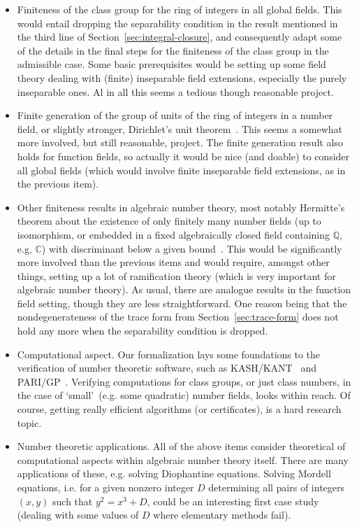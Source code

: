 \documentclass[a4paper,USenglish,cleveref, autoref, thm-restate]{lipics-v2021}
\newcommand{\C}{\mathbb{C}}
\newcommand{\Q}{\mathbb{Q}}
\begin{document}
\begin{itemize}
\item Finiteness of the class group for the ring of integers in all global fields. This would entail dropping the separability condition in the result mentioned in the third line of Section~\ref{sec:integral-closure}, and consequently adapt some of the details in the final steps for the finiteness of the class group in the admissible case. Some basic prerequisites would be setting up some field theory dealing with (finite) inseparable field extensions, especially the purely inseparable ones. 
Al in all this seems a tedious though reasonable project.
\item Finite generation of the group of units of the ring of integers in a number field, or slightly stronger, Dirichlet's unit theorem~\cite[Theorem 7.4]{Neukirch}. This seems a somewhat more involved, but still reasonable, project. The finite generation result also holds for function fields, so actually it would be nice (and doable) to consider all global fields (which would  involve finite inseparable field extensions, as in the previous item).
\item Other finiteness results in algebraic number theory, most notably Hermitte's theorem about the existence of only finitely many number fields (up to isomorphism, or embedded in a fixed algebraically closed field containing $\Q$, e.g. $\C$) with discriminant below a given bound~\cite[Theorem 2.16]{Neukirch}. This would be significantly more involved than the previous items and would require, amongst other things, setting up a lot of ramification theory (which is very important for algebraic number theory).
As usual, there are analogue results in the function field setting, though they are less straightforward. One reason being that the nondegenerateness of the trace form from Section~\ref{sec:trace-form} does not hold any more when the separability condition is dropped.
\item Computational aspect. Our formalization lays some foundations to the verification of number theoretic software,
such as KASH/KANT~\cite{kash} and PARI/GP~\cite{PARI2}. Verifying computations for class groups, or just class numbers, in the case of \lq small\rq\ (e.g. some quadratic) number fields, looks within reach. Of course, getting really efficient algorithms (or certificates), is a hard research topic. 
\item Number theoretic applications. All of the above items consider theoretical of computational aspects within algebraic number theory itself. There are many applications of these, e.g. solving Diophantine equations. Solving Mordell equations, i.e. for a given nonzero integer $D$ determining all pairs of integers $(x,y)$ such that $y^2=x^3+D$, could be an interesting first case study (dealing with some values of $D$ where elementary methods fail).
\end{itemize}
\end{document}
